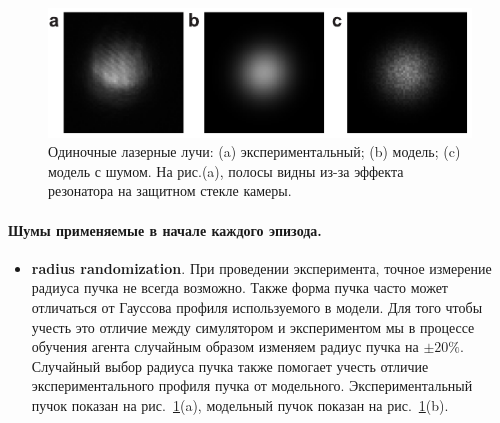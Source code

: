 \begin{figure}
\centering
  \includegraphics[width=0.8\linewidth]{images/beamsamples.pdf}

\caption{Одиночные лазерные лучи: (a) экспериментальный; (b) модель; (c) модель с шумом. На рис.(a), полосы видны из-за эффекта резонатора на защитном стекле камеры.}
\label{fig:rad_fit}
\end{figure}


\paragraph{Шумы применяемые в начале каждого эпизода.} 
\begin{itemize}
    \item \textbf{radius randomization}. При проведении эксперимента, точное измерение радиуса пучка не всегда возможно. Также форма пучка часто может отличаться от Гауссова профиля используемого в модели. Для того чтобы учесть это отличие между симулятором и экспериментом мы в процессе обучения агента случайным образом изменяем радиус пучка на $\pm 20\%$. Случайный выбор радиуса пучка также помогает учесть отличие экспериментального профиля пучка от модельного. Экспериментальный пучок показан на рис.~\ref{fig:rad_fit}(a), модельный пучок показан на рис.~\ref{fig:rad_fit}(b).
\end{itemize}

